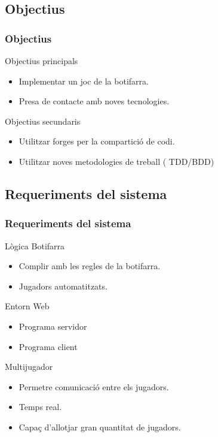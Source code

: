 \documentclass[notitlepage]{beamer}
\begin{document}
\subsection{Objectius}
\begin{frame}
\frametitle{Objectius}
\begin{block}{Objectius principals}
\begin{itemize}
    \item{Implementar un joc de la botifarra.}
    \item{Presa de contacte amb noves tecnologies.}  
\end{itemize}
\end{block}

\begin{block}{Objectius secundaris}
\begin{itemize}
    \item{Utilitzar forges per la compartició de codi.}
    \item{Utilitzar noves metodologies de treball ( TDD/BDD)}  
\end{itemize}
\end{block}

\end{frame}


\subsection{Requeriments del sistema}
\begin{frame}
\frametitle{Requeriments del sistema}
\begin{block}{Lògica Botifarra}
\begin{itemize}
    \item{Complir amb les regles de la botifarra.}
    \item{Jugadors automatitzats.}
\end{itemize}
\end{block}

\begin{block}{Entorn Web}
\begin{itemize}
    \item{Programa servidor}
    \item{Programa client}
\end{itemize}
\end{block}

\begin{block}{Multijugador}
\begin{itemize}
    \item{Permetre comunicació entre els jugadors.}
    \item{Temps real.}
    \item{Capaç d'allotjar gran quantitat de jugadors.}
\end{itemize}
\end{block}
\end{frame}
\end{document}
